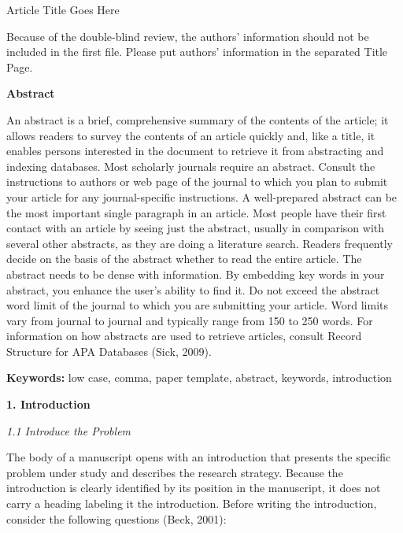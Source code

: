 \documentclass[twoside,10.5pt]{article}%
\begin{document}
\begin{center}
{\LARGE{Article Title Goes Here}}\\[20pt]
\end{center}
{\color{red} Because of the double-blind review, the authors' information should not be included in the first file.
Please put authors' information in the separated Title Page.}

\textbf{Abstract}

An abstract is a brief, comprehensive summary of the contents of the article; it allows readers to survey the contents of an article quickly and, like a title, it enables persons interested in the document to retrieve it from abstracting and indexing databases. Most scholarly journals require an abstract. Consult the instructions to authors or web page of the journal to which you plan to submit your article for any journal-specific instructions. A well-prepared abstract can be the most important single paragraph in an article. Most people have their first contact with an article by seeing just the abstract, usually in comparison with several other abstracts, as they are doing a literature search. Readers frequently decide on the basis of the abstract whether to read the entire article. The abstract needs to be dense with information. By embedding key words in your abstract, you enhance the user's ability to find it. Do not exceed the abstract word limit of the journal to which you are submitting your article. Word limits vary from journal to journal and typically range from 150 to 250 words. For information on how abstracts are used to retrieve articles, consult Record Structure for APA Databases (Sick, 2009).

\textbf{Keywords:} low case, comma, paper template, abstract, keywords, introduction

\textbf{1. Introduction}

\emph{1.1 Introduce the Problem}

The body of a manuscript opens with an introduction that presents the specific problem under study and describes the research strategy. Because the introduction is clearly identified by its position in the manuscript, it does not carry a heading labeling it the introduction. Before writing the introduction, consider the following questions (Beck, 2001):
\end{document}
